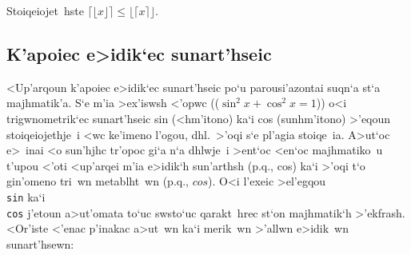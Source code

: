 \halign{
\strut \hfill$#$ & \quad \tt # \qquad\qquad &
       \hfill$#$ & \quad \tt # \qquad\qquad &
       \hfill$#$ & \quad \tt #  \cr
\noalign{\hrule} \noalign{\smallskip}
(       & (        & )          & )           & [        & [         \cr
]       & ]        &\{          & \\\lb       & \}       & \\\rb     \cr
\lfloor & \\lfloor &\rfloor     &\\rfloor     & \lceil   & \\lceil   \cr
\rceil  & \\rceil  &\langle     & \\langle    & \rangle  & \\rangle  \cr
/       & /        & \backslash & \\backslash &|         & |         \cr
\|      & \\|      &\uparrow    & \\uparrow   & \Uparrow & \\Uparrow \cr
\downarrow & \\downarrow & \Downarrow & \\Downarrow
                        & \updownarrow & \\updownarrow \cr
\Updownarrow & \\Updownarrow \cr
       }   

\toindex{|}

\exercise Stoiqeiojet~hste $\bigl \lceil \lfloor x \rfloor \bigr \rceil
\leq \bigl \lfloor \lceil x \rceil \bigr \rfloor$.

\subsection{K'apoiec e>idik`ec sunart'hseic}

<Up'arqoun k'apoiec e>idik`ec sunart'hseic po`u parousi'azontai suqn`a
st`a majhmatik'a.  S`e m'ia >ex'iswsh <'opwc (($\sin^2x + \cos^2x = 
1$)) o<i  trigwnometrik`ec sunart'hseic {\rm sin} (<hm'itono) ka`i {\rm
cos} (sunhm'itono) >'eqoun stoiqeiojethje~i <wc ke'imeno l'ogou, dhl.\
>'oqi s`e pl'agia stoiqe~ia.  A>ut`oc e>~inai <o sun'hjhc tr'opoc gi`a
n`a dhlwje~i >ent`oc <en`oc majhmatiko~u t'upou <'oti <up'arqei m'ia
e>idik`h sun'arthsh (p.q., {\rm cos}) ka`i >'oqi t`o gin'omeno tri~wn
metablht~wn (p.q., $ c o s$)\null. O<i l'exeic >el'egqou {\tt \\sin}
ka`i {\tt \\cos} j'etoun a>ut'omata to`uc swsto`uc qarakt~hrec st`on
majhmatik`h >'ekfrash.\TeXref{162}
<Or'iste <'enac p'inakac a>ut~wn ka`i merik~wn >'al\-lwn e>idik~wn
sunart'hsewn:

